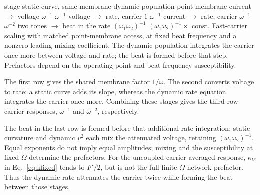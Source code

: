 \documentclass[11pt,a4paper]{article}
\providecommand{\DIFdeltex}[1]{{\protect\color{red} \scriptsize #1}} %
\providecommand{\DIFdelFL}[1]{\DIFdel{#1}} %
\providecommand{\DIFdel}[1]{\texorpdfstring{\DIFdeltex{#1}}{}} %
\begin{document}
\DIFdelFL{stage }%
\DIFdelFL{static curve, same membrane }%
\DIFdelFL{dynamic population }%
\DIFdelFL{point-membrane current $\to$ voltage }%
\DIFdelFL{$\omega^{-1}$ }%
\DIFdelFL{$\omega^{-1}$ }%
\DIFdelFL{voltage $\to$ rate, carrier }%
\DIFdelFL{$1$ }%
\DIFdelFL{$\omega^{-1}$ }%
\DIFdelFL{current $\to$ rate, carrier }%
\DIFdelFL{$\omega^{-1}$ }%
\DIFdelFL{$\omega^{-2}$ }%
\DIFdelFL{two tones $\to$ beat in the rate }%
\DIFdelFL{$(\omega_1\omega_2)^{-1}$ }%
\DIFdelFL{$(\omega_1\omega_2)^{-1}\times$ const. }%
{%
\DIFdelFL{Fast-carrier scaling with matched point-membrane access, at fixed beat frequency
and a nonzero leading mixing coefficient. The dynamic population integrates the
carrier once more between voltage and rate; the beat is formed before that step.
Prefactors depend on the operating point and beat-frequency susceptibility.}}

\DIFdel{The first row gives the shared membrane factor $1/\omega$. The second converts
voltage to rate: a static curve adds its slope, whereas the dynamic rate equation
integrates the carrier once more. Combining these stages gives the third-row
carrier responses, $\omega^{-1}$ and $\omega^{-2}$, respectively.
}%

\DIFdel{The beat in the last row is formed before that additional rate integration:
static curvature and dynamic $v^2$ each mix the attenuated voltage, retaining
$(\omega_1\omega_2)^{-1}$. Equal exponents do not imply equal amplitudes; mixing
and the susceptibility at fixed $\Omega$ determine the prefactors. For the
uncoupled carrier-averaged response, $\kappa_V$ in Eq.~\eqref{eq:kfixed} tends to
$F'/2$, but is not the full finite-$\Omega$ network prefactor. Thus the dynamic
rate attenuates the carrier twice while forming the beat between those stages.
}%
\end{document}
